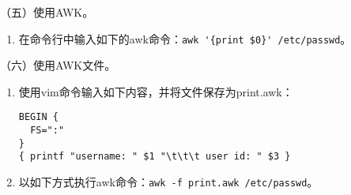 \vspace{0.1in}
（五）使用AWK。
\begin{enumerate}
  \item 在命令行中输入如下的awk命令：\verb|awk '{print $0}' /etc/passwd|。
\end{enumerate}

\vspace{0.1in}
（六）使用AWK文件。
\begin{enumerate}
  \item 使用vim命令输入如下内容，并将文件保存为print.awk：
\begin{verbatim}
BEGIN {
  FS=":"
}
{ printf "username: " $1 "\t\t\t user id: " $3 }
\end{verbatim}
  \item 以如下方式执行awk命令：\verb|awk -f print.awk /etc/passwd|。
\end{enumerate}

